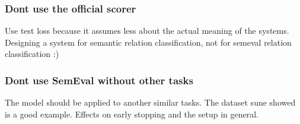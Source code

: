 \subsubsection{Dont use the official scorer}
Use test loss because it assumes less about the actual meaning of the systems. 
Designing a system for semantic relation classification, not for semeval relation classification :)

\subsubsection{Dont use SemEval without other tasks}

The model should be applied to another similar tasks. The dataset sune showed is a good example.
Effects on early stopping and the setup in general. 



